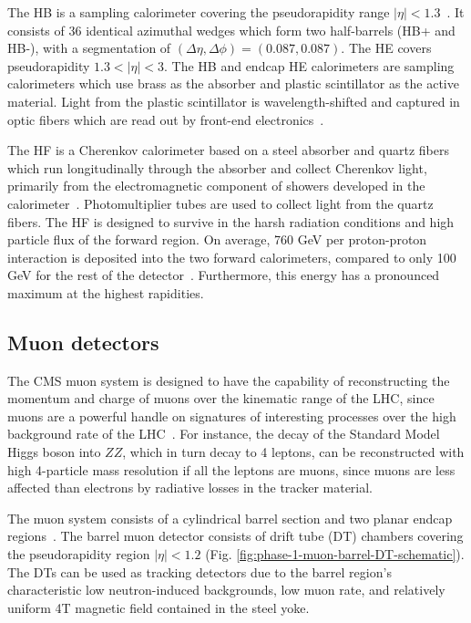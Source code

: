 The HB is a sampling calorimeter covering the pseudorapidity range $|\eta| < 1.3$~\cite{CMS-2008-JINST-3-S08004}. It consists of 36 identical azimuthal wedges which form two half-barrels (HB+ and HB-), with a segmentation of $(\Delta \eta, \Delta \phi) = (0.087, 0.087)$. The HE covers pseudorapidity $1.3 < |\eta| < 3$. The HB and endcap HE calorimeters are sampling calorimeters which use brass as the absorber and plastic scintillator as the active material. Light from the plastic scintillator is wavelength-shifted and captured in optic fibers which are read out by front-end electronics~\cite{CMS-TDR-010-2012}. 

The HF is a Cherenkov calorimeter based on a steel absorber and quartz fibers which run longitudinally through the absorber and collect Cherenkov light, primarily from the electromagnetic component of showers developed in the calorimeter~\cite{CMS-TDR-010-2012}. Photomultiplier tubes are used to  collect light from the quartz fibers. The HF is designed to survive in the harsh radiation conditions and high particle flux of the forward region. On average, 760 GeV per proton-proton interaction is deposited into the two forward calorimeters, compared to only 100 GeV for the rest of the detector~\cite{CMS-2008-JINST-3-S08004}. Furthermore, this energy has a pronounced maximum at the highest rapidities.

\subsection{Muon detectors}
The CMS muon system is designed to have the capability of reconstructing the momentum and charge of muons over the kinematic range of the LHC, since muons are a powerful handle on signatures of interesting processes over the high background rate of the LHC~\cite{CMS-2008-JINST-3-S08004}. For instance, the decay of the Standard Model Higgs boson into $ZZ$, which in turn decay to 4 leptons, can be reconstructed with high 4-particle mass resolution if all the leptons are muons, since muons are less affected than electrons by radiative losses in the tracker material. 

The muon system consists of a cylindrical barrel section and two planar endcap regions~\cite{CMS-2008-JINST-3-S08004}. The barrel muon detector consists of drift tube (DT) chambers covering the pseudorapidity region $|\eta| < 1.2$ (Fig. \ref{fig:phase-1-muon-barrel-DT-schematic}). The DTs can be used as tracking detectors due to the barrel region's characteristic low neutron-induced backgrounds, low muon rate, and relatively uniform 4T magnetic field contained in the steel yoke. 

